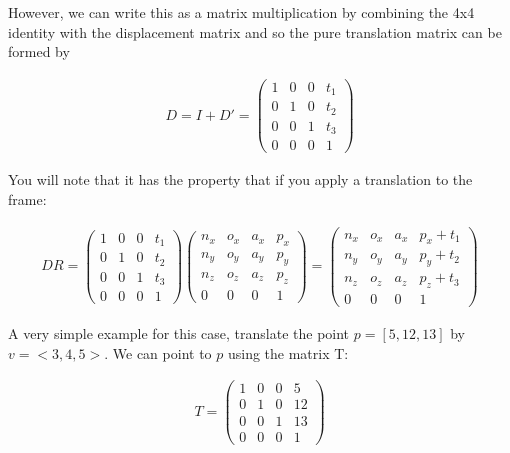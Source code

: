 However, we can write this as a matrix multiplication by combining the
4x4 identity with the displacement matrix and so the pure translation
matrix can be formed by

\[\begin{aligned}
D = I + D' = \begin{pmatrix}1 & 0 & 0 & t_1 \\
         0 & 1 & 0 & t_2\\ 0 &0 & 1 & t_3 \\
         0& 0& 0& 1 \end{pmatrix}
\end{aligned}\]

You will note that it has the property that if you apply a translation
to the frame:

\[\begin{aligned}
DR =
\begin{pmatrix}1 & 0 & 0 & t_1 \\
         0 & 1 & 0 & t_2\\ 0 &0 & 1 & t_3 \\
         0& 0& 0& 1 \end{pmatrix}
\begin{pmatrix}
         n_x & o_x & a_x & p_x \\
         n_y & o_y & a_y & p_y\\
         n_z & o_z & a_z & p_z \\
         0  &  0  &  0 & 1 \end{pmatrix}
=
\begin{pmatrix}
         n_x & o_x & a_x & p_x + t_1\\
         n_y & o_y & a_y & p_y + t_2\\
         n_z & o_z & a_z & p_z + t_3\\
         0  &  0  &  0 & 1 \end{pmatrix}
\end{aligned}\]

A very simple example for this case, translate the point \(p=[5,12,13]\)
by \(v=<3,4,5>\). We can point to \(p\) using the matrix T:

\[\begin{aligned}
T =    \begin{pmatrix}1 & 0 & 0 & 5 \\ 0 & 1 & 0 & 12\\ 0 &0 & 1 & 13 \\ 0& 0& 0& 1 \end{pmatrix}
\end{aligned}\]

